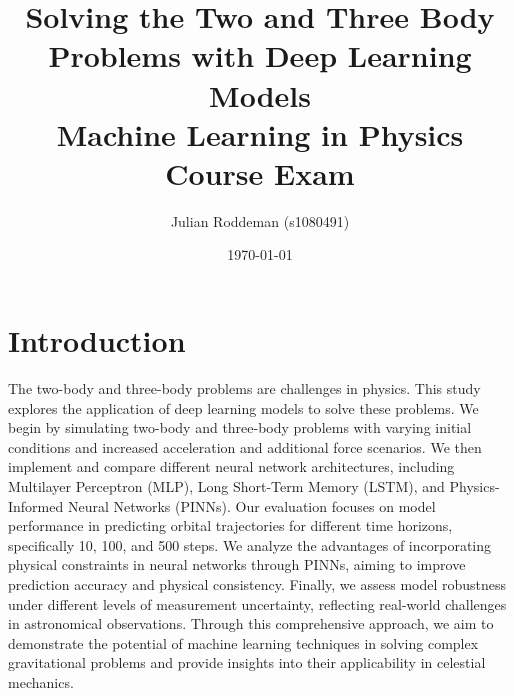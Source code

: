 \documentclass[11pt,a4paper, twocolumn]{article}
\title{Solving the Two and Three Body Problems with Deep Learning Models \\
  \large Machine Learning in Physics Course Exam}
\author{Julian Roddeman (s1080491)}
\date{\today}
\begin{document}
  \section{Introduction}
  \label{sec:introduction}
  The two-body and three-body problems are challenges in physics. This study explores the application of deep learning models to solve these problems. We begin by simulating two-body and three-body problems with varying initial conditions and increased acceleration and additional force scenarios. We then implement and compare different neural network architectures, including Multilayer Perceptron (MLP), Long Short-Term Memory (LSTM), and Physics-Informed Neural Networks (PINNs). Our evaluation focuses on model performance in predicting orbital trajectories for different time horizons, specifically 10, 100, and 500 steps. We analyze the advantages of incorporating physical constraints in neural networks through PINNs, aiming to improve prediction accuracy and physical consistency. Finally, we assess model robustness under different levels of measurement uncertainty, reflecting real-world challenges in astronomical observations. Through this comprehensive approach, we aim to demonstrate the potential of machine learning techniques in solving complex gravitational problems and provide insights into their applicability in celestial mechanics.
\end{document}
